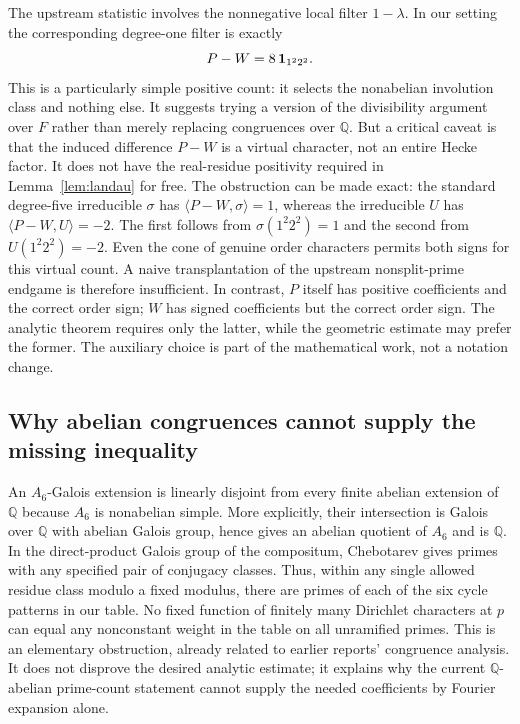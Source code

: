 \documentclass[11pt,letterpaper]{article}
\theoremstyle{remark}\newtheorem{remark}[theorem]{Remark}
\newcommand{\Q}{\mathbb Q}\newcommand{\C}{\mathbb C}\newcommand{\R}{\mathbb R}
\begin{document}
The upstream statistic involves the nonnegative local filter $1-\lambda$. In our setting the corresponding degree-one filter is exactly
\begin{equation}\label{eq:involution}
 P-W=8\,\mathbf1_{1^2 2^2}.
\end{equation}
This is a particularly simple positive count: it selects the nonabelian involution class and nothing else. It suggests trying a version of the divisibility argument over $F$ rather than merely replacing congruences over $\Q$. But a critical caveat is that the induced difference $P-W$ is a virtual character, not an entire Hecke factor. It does not have the real-residue positivity required in Lemma~\ref{lem:landau} for free. The obstruction can be made exact: the standard degree-five irreducible $\sigma$ has $\langle P-W,\sigma\rangle=1$, whereas the irreducible $U$ has $\langle P-W,U\rangle=-2$. The first follows from $\sigma(1^2 2^2)=1$ and the second from $U(1^2 2^2)=-2$. Even the cone of genuine order characters permits both signs for this virtual count. A naive transplantation of the upstream nonsplit-prime endgame is therefore insufficient. In contrast, $P$ itself has positive coefficients and the correct order sign; $W$ has signed coefficients but the correct order sign. The analytic theorem requires only the latter, while the geometric estimate may prefer the former. The auxiliary choice is part of the mathematical work, not a notation change.

\subsection{Why abelian congruences cannot supply the missing inequality}
An $A_6$-Galois extension is linearly disjoint from every finite abelian extension of $\Q$ because $A_6$ is nonabelian simple. More explicitly, their intersection is Galois over $\Q$ with abelian Galois group, hence gives an abelian quotient of $A_6$ and is $\Q$. In the direct-product Galois group of the compositum, Chebotarev gives primes with any specified pair of conjugacy classes. Thus, within any single allowed residue class modulo a fixed modulus, there are primes of each of the six cycle patterns in our table. No fixed function of finitely many Dirichlet characters at $p$ can equal any nonconstant weight in the table on all unramified primes. This is an elementary obstruction, already related to earlier reports' congruence analysis. It does not disprove the desired analytic estimate; it explains why the current $\Q$-abelian prime-count statement cannot supply the needed coefficients by Fourier expansion alone.
\end{document}
